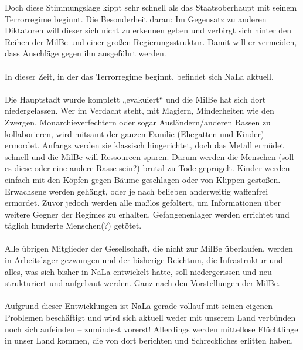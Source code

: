 Doch diese Stimmungslage kippt sehr schnell als das Staatsoberhaupt mit seinem Terrorregime beginnt.
Die Besonderheit daran: Im Gegensatz zu anderen Diktatoren will dieser sich nicht zu erkennen geben und verbirgt sich hinter den Reihen der MilBe und einer großen Regierungsstruktur.
Damit will er vermeiden, dass Anschläge gegen ihn ausgeführt werden.\\
\\
In dieser Zeit, in der das Terrorregime beginnt, befindet sich NaLa aktuell.\\
\\
Die Hauptstadt wurde komplett „evakuiert“ und die MilBe hat sich dort niedergelassen.
Wer im Verdacht steht, mit Magiern, Minderheiten wie den Zwergen, Monarchieverfechtern oder sogar Ausländern/anderen Rassen zu kollaborieren, wird mitsamt der ganzen Familie (Ehegatten und Kinder) ermordet.
Anfangs werden sie klassisch hingerichtet, doch das Metall ermüdet schnell und die MilBe will Ressourcen sparen.
Darum werden die Menschen (soll es diese oder eine andere Rasse sein?) brutal zu Tode geprügelt.
Kinder werden einfach mit den Köpfen gegen Bäume geschlagen oder von Klippen gestoßen.
Erwachsene werden gehängt, oder je nach belieben anderweitig waffenfrei ermordet. Zuvor jedoch werden alle maßlos gefoltert, um Informationen über weitere Gegner der Regimes zu erhalten.
Gefangenenlager werden errichtet und täglich hunderte Menschen(?) getötet.\\
\\
Alle übrigen Mitglieder der Gesellschaft, die nicht zur MilBe überlaufen, werden in Arbeitslager gezwungen und der bisherige Reichtum, die Infrastruktur und alles, was sich bisher in NaLa entwickelt hatte, soll niedergerissen und neu strukturiert und aufgebaut werden.
Ganz nach den Vorstellungen der MilBe.\\
\\
Aufgrund dieser Entwicklungen ist NaLa gerade vollauf mit seinen eigenen Problemen beschäftigt und wird sich aktuell weder mit unserem Land verbünden noch sich anfeinden – zumindest vorerst!
Allerdings werden mittellose Flüchtlinge in unser Land kommen, die von dort berichten und Schreckliches erlitten haben.


